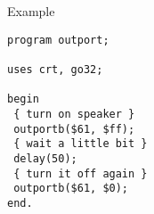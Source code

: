 \begin{FPCList}
\item[Example]
\begin{verbatim}
program outport;

uses crt, go32;

begin
 { turn on speaker }
 outportb($61, $ff);
 { wait a little bit }
 delay(50);
 { turn it off again }
 outportb($61, $0);
end.\end{verbatim}
\end{FPCList}